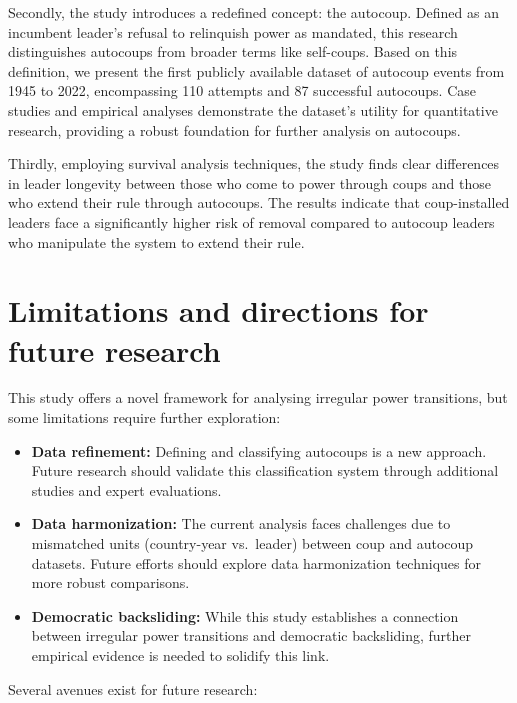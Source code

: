 \documentclass[
  12pt,
]{report}
\begin{document}
Secondly, the study introduces a redefined concept: the autocoup.
Defined as an incumbent leader's refusal to relinquish power as
mandated, this research distinguishes autocoups from broader terms like
self-coups. Based on this definition, we present the first publicly
available dataset of autocoup events from 1945 to 2022, encompassing 110
attempts and 87 successful autocoups. Case studies and empirical
analyses demonstrate the dataset's utility for quantitative research,
providing a robust foundation for further analysis on autocoups.

Thirdly, employing survival analysis techniques, the study finds clear
differences in leader longevity between those who come to power through
coups and those who extend their rule through autocoups. The results
indicate that coup-installed leaders face a significantly higher risk of
removal compared to autocoup leaders who manipulate the system to extend
their rule.

\section{Limitations and directions for future
research}\label{limitations-and-directions-for-future-research}

This study offers a novel framework for analysing irregular power
transitions, but some limitations require further exploration:

\begin{itemize}
\item
  \textbf{Data refinement:} Defining and classifying autocoups is a new
  approach. Future research should validate this classification system
  through additional studies and expert evaluations.
\item
  \textbf{Data harmonization:} The current analysis faces challenges due
  to mismatched units (country-year vs.~leader) between coup and
  autocoup datasets. Future efforts should explore data harmonization
  techniques for more robust comparisons.
\item
  \textbf{Democratic backsliding:} While this study establishes a
  connection between irregular power transitions and democratic
  backsliding, further empirical evidence is needed to solidify this
  link.
\end{itemize}

Several avenues exist for future research:
\end{document}
